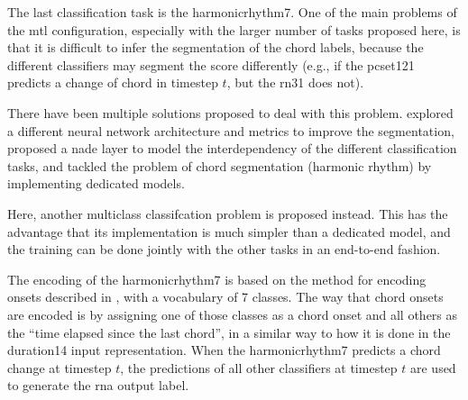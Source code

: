 
The last classification task is the \gls{harmonicrhythm7}.
One of the main problems of the \gls{mtl} configuration,
especially with the larger number of tasks proposed here, is
that it is difficult to infer the segmentation of the chord
labels, because the different classifiers may segment the
score differently (e.g., if the \gls{pcset121} predicts a
change of chord in timestep $t$, but the \gls{rn31} does
not).

There have been multiple solutions proposed to deal with
this problem. \textcite{chen2021attend} explored a different
neural network architecture and metrics to improve the
segmentation, \textcite{micchi2021deep} proposed a
\gls{nade} layer to model the interdependency of the
different classification tasks, \textcite{mcleod2021modular}
and  \textcite{wu2021melody} tackled the problem of chord
segmentation (harmonic rhythm) by implementing dedicated
models. 

Here, another multiclass classifcation problem is proposed
instead. This has the advantage that its implementation is
much simpler than a dedicated model, and the training can be
done jointly with the other tasks in an end-to-end fashion.

The encoding of the \gls{harmonicrhythm7} is based on the
method for encoding onsets described in
, with a
vocabulary of 7 classes. The way that chord onsets are
encoded is by assigning one of those classes as a chord
onset and all others as the ``time elapsed since the last
chord'', in a similar way to how it is done in the
\gls{duration14} input representation. When the
\gls{harmonicrhythm7} predicts a chord change at timestep
$t$, the predictions of all other classifiers at timestep
$t$ are used to generate the \gls{rna} output label.

